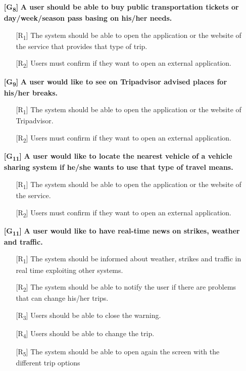 \documentclass[12pt,titlepage]{article}
\begin{document}
\begin{itemize}
\item[\textbf{ {[G\textsubscript{8}]}}]	\textbf{	A user should be able to buy public transportation tickets or day/week/season pass basing on his/her needs.}
\begin{itemize}
\item[{[R\textsubscript{1}]}]  The system should be able to open the application or the website of the service that provides that type of trip.
\item[{[R\textsubscript{2}]}] Users must confirm if they want to open an external application.
\end{itemize}
\item[\textbf{ {[G\textsubscript{9}]}}]	\textbf{	A user would like to see on Tripadvisor advised places for his/her breaks.}
\begin{itemize}
\item[{[R\textsubscript{1}]}]  The system should be able to open the application or the website of Tripadvisor.
\item[{[R\textsubscript{2}]}] Users must confirm if they want to open an external application.
\end{itemize}

\item[\textbf{ {[G\textsubscript{11}]}}]	\textbf{	A user would like to locate the nearest vehicle of a vehicle sharing system if he/she wants to use that type of travel means.}
\begin{itemize}
\item[{[R\textsubscript{1}]}]  The system should be able to open the application or the website of the service.
\item[{[R\textsubscript{2}]}] Users must confirm if they want to open an external application.
\end{itemize}

\item[\textbf{ {[G\textsubscript{11}]}}]	\textbf{	A user would like to have real-time news on strikes, weather and traffic.}
\begin{itemize}
\item[{[R\textsubscript{1}]}] The system should be informed about weather, strikes and traffic in real time exploiting other systems.
\item[{[R\textsubscript{2}]}]  The system should be able to notify the user if there are problems that can change his/her trips.
\item[{[R\textsubscript{3}]}] Users should be able to close the warning.
\item[{[R\textsubscript{4}]}] Users should be able to change the trip.
\item[{[R\textsubscript{5}]}]  The system should be able to open again the screen with the different trip options
\end{itemize}
\end{itemize}
\end{document}
